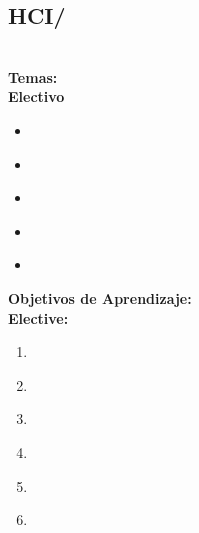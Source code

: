 \subsection{HCI/\HCIMixedAugmentedandVirtualReality}\label{sec:BOK:HCIMixedAugmentedandVirtualReality}
\HCIMixedAugmentedandVirtualRealityDescription\\
\noindent \textbf{Temas:}\\
\noindent \textbf{Electivo}
\begin{itemize}
	\item \HCIMixedAugmentedandVirtualRealityTopicOutput\label{sec:BOK:HCIMixedAugmentedandVirtualRealityTopicOutput}
	\item \HCIMixedAugmentedandVirtualRealityTopicUser\label{sec:BOK:HCIMixedAugmentedandVirtualRealityTopicUser}
	\item \HCIMixedAugmentedandVirtualRealityTopicPhysical\label{sec:BOK:HCIMixedAugmentedandVirtualRealityTopicPhysical}
	\item \HCIMixedAugmentedandVirtualRealityTopicSystem\label{sec:BOK:HCIMixedAugmentedandVirtualRealityTopicSystem}
	\item \HCIMixedAugmentedandVirtualRealityTopicNetworking\label{sec:BOK:HCIMixedAugmentedandVirtualRealityTopicNetworking}
\end{itemize}


\noindent \textbf{Objetivos de Aprendizaje:}\\
\noindent \textbf{Elective:}
\begin{enumerate}
	\setcounter{enumi}{0}
	\item \HCIMixedAugmentedandVirtualRealityLODescribeTheRealized\xspace[\HCIMixedAugmentedandVirtualRealityLODescribeTheRealizedLevel]\label{sec:BOK:HCIMixedAugmentedandVirtualRealityLODescribeTheRealized}
	\item \HCIMixedAugmentedandVirtualRealityLODescribeTheDifferentTechnologies\xspace[\HCIMixedAugmentedandVirtualRealityLODescribeTheDifferentTechnologiesLevel]\label{sec:BOK:HCIMixedAugmentedandVirtualRealityLODescribeTheDifferentTechnologies}
	\item \HCIMixedAugmentedandVirtualRealityLODescribeTheGeometry\xspace[\HCIMixedAugmentedandVirtualRealityLODescribeTheGeometryLevel]\label{sec:BOK:HCIMixedAugmentedandVirtualRealityLODescribeTheGeometry}
	\item \HCIMixedAugmentedandVirtualRealityLODescribeTheUser\xspace[\HCIMixedAugmentedandVirtualRealityLODescribeTheUserLevel]\label{sec:BOK:HCIMixedAugmentedandVirtualRealityLODescribeTheUser}
	\item \HCIMixedAugmentedandVirtualRealityLODetermineThe\xspace[\HCIMixedAugmentedandVirtualRealityLODetermineTheLevel]\label{sec:BOK:HCIMixedAugmentedandVirtualRealityLODetermineThe}
	\item \HCIMixedAugmentedandVirtualRealityLODescribeSeveralFor\xspace[\HCIMixedAugmentedandVirtualRealityLODescribeSeveralForLevel]\label{sec:BOK:HCIMixedAugmentedandVirtualRealityLODescribeSeveralFor}
\end{enumerate}





